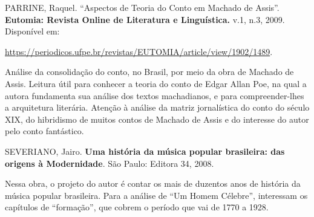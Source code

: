 \documentclass[11pt]{extarticle}
\begin{document}
PARRINE, Raquel. ``Aspectos de Teoria do Conto em Machado de Assis''.
\textbf{Eutomia: Revista Online de Literatura e Linguística.} v.1, n.3,
2009. Disponível em:

\url{https://periodicos.ufpe.br/revistas/EUTOMIA/article/view/1902/1489}.

Análise da consolidação do conto, no Brasil, por meio da obra de Machado
de Assis. Leitura útil para conhecer a teoria do conto de Edgar Allan
Poe, na qual a autora fundamenta sua análise dos textos machadianos, e
para compreender-lhes a arquitetura literária. Atenção à análise da
matriz jornalística do conto do século XIX, do hibridismo de muitos
contos de Machado de Assis e do interesse do autor pelo conto
fantástico.

SEVERIANO, Jairo. \textbf{Uma história da música popular brasileira: das
origens à Modernidade}. São Paulo: Editora 34, 2008.

Nessa obra, o projeto do autor é contar os mais de duzentos anos de
história da música popular brasileira. Para a análise de ``Um Homem
Célebre'', interessam os capítulos de ``formação'', que cobrem o período
que vai de 1770 a 1928.
\end{document}
